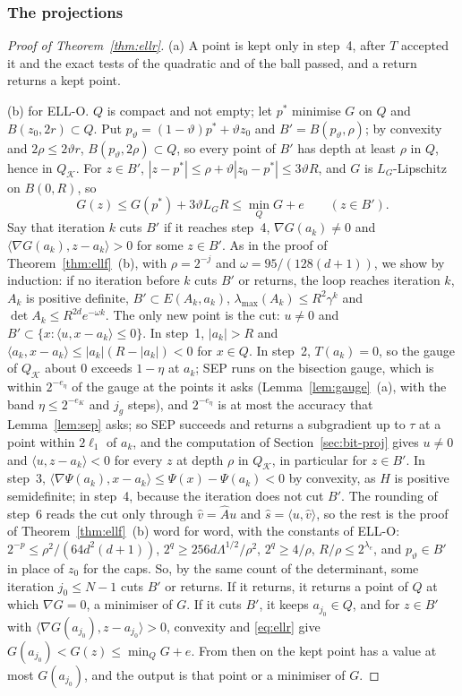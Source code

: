 \documentclass[11pt]{amsart}
\theoremstyle{definition}
\numberwithin{equation}{section}
\newcommand{\cK}{\mathcal{K}}
\newcommand{\ip}[1]{\langle #1\rangle}
\begin{document}
\subsubsection{The projections}

\begin{proof}[Proof of Theorem~\ref{thm:ellr}]
(a) A point is kept only in step~4, after $T$ accepted it and the exact tests of the quadratic and of the ball passed, and a return returns a kept point.

(b) for ELL-O. $Q$ is compact and not empty; let $p^*$ minimise $G$ on $Q$ and $B(z_0,2r)\subset Q$. Put $p_\vartheta=(1-\vartheta)p^*+\vartheta z_0$ and $B'=B(p_\vartheta,\rho)$; by convexity and $2\rho\le2\vartheta r$, $B(p_\vartheta,2\rho)\subset Q$, so every point of $B'$ has depth at least $\rho$ in $Q$, hence in $Q_\cK$. For $z\in B'$, $|z-p^*|\le\rho+\vartheta|z_0-p^*|\le3\vartheta R$, and $G$ is $L_G$-Lipschitz on $B(0,R)$, so
\begin{equation}\label{eq:ellr}
G(z)\le G(p^*)+3\vartheta L_GR\le\min_QG+e\qquad(z\in B').
\end{equation}
Say that iteration $k$ cuts $B'$ if it reaches step~4, $\nabla G(a_k)\ne0$ and $\ip{\nabla G(a_k),z-a_k}>0$ for some $z\in B'$. As in the proof of Theorem~\ref{thm:ellf}~(b), with $\rho=2^{-j}$ and $\omega=95/(128(d+1))$, we show by induction: if no iteration before $k$ cuts $B'$ or returns, the loop reaches iteration $k$, $A_k$ is positive definite, $B'\subset E(A_k,a_k)$, $\lambda_{\max}(A_k)\le R^2\gamma^k$ and $\det A_k\le R^{2d}e^{-\omega k}$. The only new point is the cut: $u\ne0$ and $B'\subset\{x:\ip{u,x-a_k}\le0\}$. In step~1, $|a_k|>R$ and $\ip{a_k,x-a_k}\le|a_k|(R-|a_k|)<0$ for $x\in Q$. In step~2, $T(a_k)=0$, so the gauge of $Q_\cK$ about $0$ exceeds $1-\eta$ at $a_k$; SEP runs on the bisection gauge, which is within $2^{-e_\eta}$ of the gauge at the points it asks (Lemma~\ref{lem:gauge}~(a), with the band $\eta\le2^{-e_K}$ and $j_g$ steps), and $2^{-e_\eta}$ is at most the accuracy that Lemma~\ref{lem:sep} asks; so SEP succeeds and returns a subgradient up to $\tau$ at a point within $2\ell_1$ of $a_k$, and the computation of Section~\ref{sec:bit-proj} gives $u\ne0$ and $\ip{u,z-a_k}<0$ for every $z$ at depth $\rho$ in $Q_\cK$, in particular for $z\in B'$. In step~3, $\ip{\nabla\Psi(a_k),x-a_k}\le\Psi(x)-\Psi(a_k)<0$ by convexity, as $H$ is positive semidefinite; in step~4, because the iteration does not cut $B'$. The rounding of step~6 reads the cut only through $\hat v=\hat Au$ and $\hat s=\ip{u,\hat v}$, so the rest is the proof of Theorem~\ref{thm:ellf}~(b) word for word, with the constants of ELL-O: $2^{-p}\le\rho^2/(64d^2(d+1))$, $2^q\ge256d\Lambda^{1/2}/\rho^2$, $2^q\ge4/\rho$, $R/\rho\le2^{\lambda_e}$, and $p_\vartheta\in B'$ in place of $z_0$ for the caps. So, by the same count of the determinant, some iteration $j_0\le N-1$ cuts $B'$ or returns. If it returns, it returns a point of $Q$ at which $\nabla G=0$, a minimiser of $G$. If it cuts $B'$, it keeps $a_{j_0}\in Q$, and for $z\in B'$ with $\ip{\nabla G(a_{j_0}),z-a_{j_0}}>0$, convexity and \eqref{eq:ellr} give $G(a_{j_0})<G(z)\le\min_QG+e$. From then on the kept point has a value at most $G(a_{j_0})$, and the output is that point or a minimiser of $G$.


\end{proof}
\end{document}
